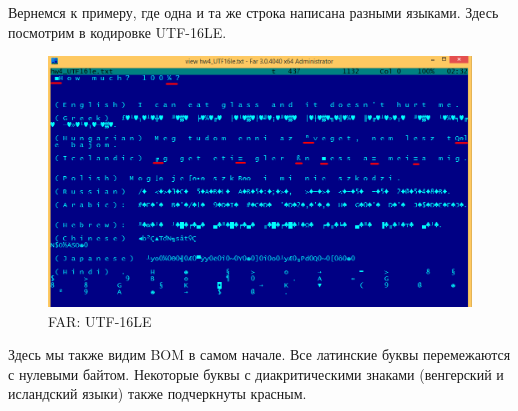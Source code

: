 Вернемся к примеру, где одна и та же строка написана разными языками.
Здесь посмотрим в кодировке UTF-16LE.

\begin{figure}[H]
\centering
\includegraphics[scale=\FigScale]{digging_into_code/strings/multilang_sampler_UTF16.png}
\caption{FAR: UTF-16LE}
\end{figure}

Здесь мы также видим \ac{BOM} в самом начале.
Все латинские буквы перемежаются с нулевыми байтом.
Некоторые буквы с диакритическими знаками (венгерский и исландский языки) также подчеркнуты красным.




